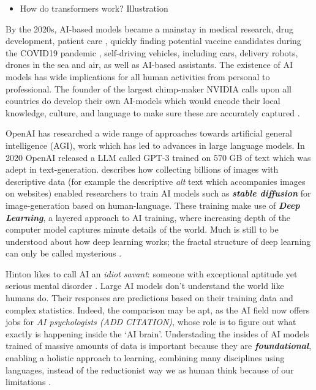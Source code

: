 \documentclass[
  letterpaper,
  DIV=11,
  numbers=noendperiod]{scrartcl}
\providecommand{\tightlist}{%
  \setlength{\itemsep}{0pt}\setlength{\parskip}{0pt}}\usepackage{longtable,booktabs,array}
\begin{document}
\begin{itemize}
\tightlist
\item
  How do transformers work? Illustration
  \citet{alammarIllustratedTransformer2018}
\end{itemize}

By the 2020s, AI-based models became a mainstay in medical research,
drug development, patient care
\citep{LEITE20212515, holzingerAILifeTrends2023}, quickly finding
potential vaccine candidates during the COVID19 pandemic
\citep{ZAFAR2022249}, self-driving vehicles, including cars, delivery
robots, drones in the sea and air, as well as AI-based assistants. The
existence of AI models has wide implications for all human activities
from personal to professional. The founder of the largest chimp-maker
NVIDIA calls upon all countries do develop their own AI-models which
would encode their local knowledge, culture, and language to make sure
these are accurately captured
\citep{worldgovernmentssummitConversationFounderNVIDIA2024}.

OpenAI has researched a wide range of approaches towards artificial
general intelligence (AGI), work which has led to advances in large
language
models\citep{ilyasutskeverIlyaSutskeverAI2018, aifrontiersIlyaSutskeverAI2018}.
In 2020 OpenAI released a LLM called GPT-3 trained on 570 GB of text
\citep{alextamkinHowLargeLanguage2021} which was adept in
text-generation. \citep{Singer2022MakeAVideoTG} describes how collecting
billions of images with descriptive data (for example the descriptive
\emph{alt} text which accompanies images on websites) enabled
researchers to train AI models such as \textbf{\emph{stable diffusion}}
for image-generation based on human-language. These training make use of
\textbf{\emph{Deep Learning}}, a layered approach to AI training, where
increasing depth of the computer model captures minute details of the
world. Much is still to be understood about how deep learning works; the
fractal structure of deep learning can only be called mysterious
\citep{sohl-dicksteinBoundaryNeuralNetwork2024}.

Hinton likes to call AI an \emph{idiot savant}: someone with exceptional
aptitude yet serious mental disorder
\citep{cbsmorningsFullInterviewGodfather2023}. Large AI models don't
understand the world like humans do. Their responses are predictions
based on their training data and complex statistics. Indeed, the
comparison may be apt, as the AI field now offers jobs for \emph{AI
psychologists (ADD CITATION)}, whose role is to figure out what exactly
is happening inside the `AI brain'. Understading the insides of AI
models trained of massive amounts of data is important because they are
\textbf{\emph{foundational}}, enabling a holistic approach to learning,
combining many disciplines using languages, instead of the reductionist
way we as human think because of our limitations
\citep{capinstituteGettingRealArtificial2023}.
\end{document}
